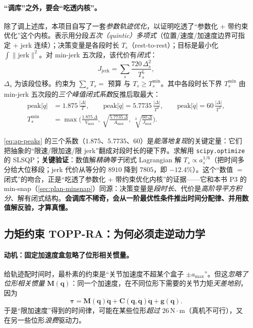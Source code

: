 \paragraph{“调库”之外，要会“吃透内核”。}
除了调上述库，本项目自写了一套\emph{参数轨迹优化}，以证明吃透了“参数化 + 带约束优化”这个内核。表示用分段\emph{五次（quintic）多项式}（位置/速度/加速度边界可指定 + jerk 连续）；决策变量是各段时长 $T_s$（rest-to-rest）；目标是最小化 $\int\|\mathrm{jerk}\|^2$。对 min-jerk 五次段，该代价有\emph{闭式}：
\begin{equation}
  J_{\mathrm{jerk}}=\sum_s \frac{720\,\Delta_s^2}{T_s^{5}},
  \label{eq:ap-jerk-cost}
\end{equation}
$\Delta_s$ 为该段位移。约束为 $\sum_s T_s=$ 预算 与 $T_s\ge T_s^{\min}$。其中各段时长下界 $T_s^{\min}$ 由 min-jerk 五次段的\emph{三个峰值闭式系数}反推后取最大：
\begin{align}
  \mathrm{peak}|\dot q| &= 1.875\,\frac{|\Delta|}{T}, \qquad
  \mathrm{peak}|\ddot q| = 5.7735\,\frac{|\Delta|}{T^2}, \qquad
  \mathrm{peak}|\dddot q| = 60\,\frac{|\Delta|}{T^3},
  \label{eq:ap-peaks}\\
  T_s^{\min} &= \max\!\Big(\tfrac{1.875\,\Delta}{V_{\max}},\ \sqrt{\tfrac{5.7735\,\Delta}{A_{\max}}},\ \sqrt[3]{\tfrac{60\,\Delta}{J_{\max}}}\Big).
  \label{eq:ap-tmin}
\end{align}

\begin{insight}\label{ins:ap-tmin}
\cref{eq:ap-peaks} 的三个系数（$1.875$、$5.7735$、$60$）是\emph{能落地复现}的关键定量：它们把抽象的“限速/限加速/限 jerk”翻成对段时长的硬下界。求解用 \texttt{scipy.optimize} 的 SLSQP；\textbf{关键验证}：数值解\emph{精确等于}闭式 Lagrangian 解 $T_s\propto a_s^{1/6}$（把时间多分给大位移段；jerk 代价从等分的 $8910$ 降到 $7805$，即 $-12.4\%$）。这个“数值 $=$ 闭式”的吻合，正是“吃透了参数化 + 带约束优化内核”的证据——它和本书 P3 的 min-snap（\cref{sec:plan-minsnap}）同源：决策变量是\emph{段时长}、代价是\emph{高阶导平方积分}、解有闭式结构。\textbf{会调库不稀奇，会从一阶最优性条件推出时间分配律、并用数值解反验，才算真懂。}
\end{insight}

\subsection{力矩约束 TOPP-RA：为何必须走逆动力学}
\label{sec:ap-torque-topp}

\paragraph{动机：固定加速度盒忽略了位形相关惯量。}
给轨迹配时间时，最朴素的约束是“关节加速度不超某个盒子 $\pm a_{\max}$”。但这\emph{忽略了位形相关惯量} $\mathbf{M}(\mathbf{q})$：同一个加速度，在不同位形下需要的关节力矩\emph{天差地别}，因为
\begin{equation}
  \boldsymbol{\tau}=\mathbf{M}(\mathbf{q})\ddot{\mathbf{q}}+\mathbf{C}(\mathbf{q},\dot{\mathbf{q}})\dot{\mathbf{q}}+\mathbf{g}(\mathbf{q}).
  \label{eq:ap-tau-invdyn}
\end{equation}
于是“限加速度”得到的时间律，可能在某些位形\emph{超过} $26\,\mathrm{N\!\cdot\! m}$（真机不可行），又在另一些位形\emph{浪费}驱动力。

